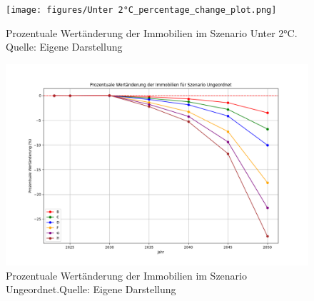 \begin{figure}[H]
    \centering
    \texttt{[image: figures/Unter 2°C\_percentage\_change\_plot.png]}
    \caption{Prozentuale Wertänderung der Immobilien im Szenario Unter 2°C. Quelle: Eigene Darstellung}
    \label{fig:unter_2c}
\end{figure}

\begin{figure}[H]
    \centering
    \includegraphics[width=\linewidth]{figures/Ungeordnet_percentage_change_plot.png}
    \caption{Prozentuale Wertänderung der Immobilien im Szenario Ungeordnet.Quelle: Eigene Darstellung}
    \label{fig:ungeordnet}
\end{figure}

